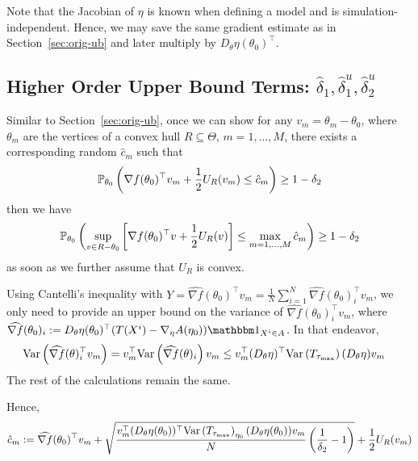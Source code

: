 \documentclass[10pt]{article}
\begin{document}
Note that the Jacobian of $\eta$ is known when defining a model 
and is simulation-independent.
Hence, we may save the same gradient estimate as in Section~\ref{sec:orig-ub}
and later multiply by $D_{\theta} \eta(\theta_0)^\top$.    

\subsection{Higher Order Upper Bound Terms: $\hat{\delta}_1, \hat{\delta}_1^u, \hat{\delta}_2^u$}%
\label{ssec:higher-order-ub-terms}
    
Similar to Section~\ref{sec:orig-ub},
once we can show for any $v_m = \theta_m - \theta_0$, 
where $\theta_m$ are the vertices of a convex hull $R \subseteq \Theta$,
$m=1,\ldots, M$,
there exists a corresponding random $\hat{c}_m$ such that
\[
    \PPP_{\theta_0}\paren{%
        \nabla f(\theta_0)^\top v_m
        +
        \frac{1}{2}U_R(v_m)
        \leq 
        \hat{c}_m
    } 
    \geq 1-\delta_2
\]
then we have
\[
    \PPP_{\theta_0}\paren{%
        \sup\limits_{v\in R-\theta_0} 
        \bracket{%
            \nabla f(\theta_0)^\top v
            + 
            \frac{1}{2}U_R(v)
        }
        \leq 
        \max\limits_{m=1,\ldots, M} \hat{c}_m
    } 
    \geq 
    1-\delta_2
\]
as soon as we further assume that $U_R$ is convex.

Using Cantelli's inequality
with $Y = \widehat{\nabla f}(\theta_0)^\top v_m = \frac{1}{N} \sum\limits_{i=1}^N \widehat{\nabla f}(\theta_0)_i^\top v_m$,
we only need to provide an upper bound on the variance of $\widehat{\nabla f}(\theta_0)_i^\top v_m$,
where $\widehat{\nabla f}(\theta_0)_i := D_\theta \eta(\theta_0)^\top (T(X^i)-\nabla_\eta A(\eta_0)) \indic{X^i \in A}$.
In that endeavor,
\begin{align*}
    \text{Var}\left(\widehat{\nabla f}(\theta)_i^\top v_m\right)
    &=
    v_m^\top \text{Var}\left(\widehat{\nabla f}(\theta)_i\right) v_m
    \leq 
    v_m^\top (D_\theta \eta)^\top \text{Var}\left(T_{\tau_{\max}}\right) (D_\theta \eta) v_m
\end{align*}
The rest of the calculations remain the same.

Hence, 
\begin{align*}
    \hat{c}_m
    :=
    \widehat{\nabla f}(\theta_0)^\top v_m
    +
    \sqrt{
        \frac{v_m^\top (D_\theta \eta(\theta_0))^\top \text{Var}\left(T_{\tau_{\max}}\right)_{\eta_0} (D_\theta \eta(\theta_0)) v_m}{N}
        \left(\frac{1}{\delta_2} - 1\right)
    }
    +
    \frac{1}{2} U_R(v_m)
\end{align*}
\end{document}
